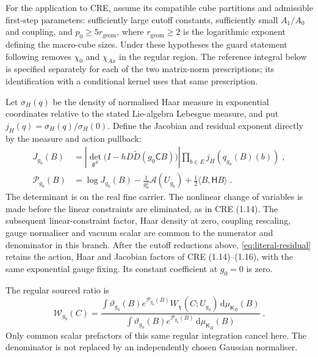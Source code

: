 \documentclass[11pt]{article}
\newcommand{\dd}{\mathrm{d}}
\begin{document}
For the application to CRE, assume its compatible cube partitions and admissible first-step parameters: sufficiently large cutoff constants, sufficiently small $A_1/A_0$ and coupling, and $p_0\geq5r_{\mathrm{geom}}$, where $r_{\mathrm{geom}}\geq2$ is the logarithmic exponent defining the macro-cube sizes. Under these hypotheses the guard statement following \cite[(1.10)]{BalabanCRE} removes $\chi_0$ and $\chi_{Ax}$ in the regular region. The reference integral below is specified separately for each of the two matrix-norm prescriptions; its identification with a conditional kernel uses that same prescription.

Let $\sigma_H(q)$ be the density of normalised Haar measure in exponential coordinates relative to the stated Lie-algebra Lebesgue measure, and put $j_H(q)=\sigma_H(q)/\sigma_H(0)$. Define the Jacobian and residual exponent directly by the measure and action pullback:
\begin{equation}\label{eq:literal-residual}
    \begin{aligned}
        J_{g_0}(B)&=
            \left|\det_{\mathfrak g^E}
                \bigl(I-hD\widetilde D(g_0\mathsf C B)\bigr)\right|
            \prod_{b\in E}j_H(q_{g_0}(B)(b))\;,\\
        \mathcal P_{g_0}(B)&=\log J_{g_0}(B)
            -\frac{1}{g_0^2}\mathscr A(U_{g_0})
            +\frac{1}{2}\langle B,\mathsf H B\rangle\;.
    \end{aligned}
\end{equation}
The determinant is on the real fine carrier. The nonlinear change of variables is made before the linear constraints are eliminated, as in CRE (1.14). The subsequent linear-constraint factor, Haar density at zero, coupling rescaling, gauge normaliser and vacuum scalar are common to the numerator and denominator in this branch. After the cutoff reductions above, \eqref{eq:literal-residual} retains the action, Haar and Jacobian factors of CRE (1.14)--(1.16), with the same exponential gauge fixing. Its constant coefficient at $g_0=0$ is zero.

The regular sourced ratio is
\begin{equation}\label{eq:flat-ratio}
    \mathcal W_{g_0}(C)=
        \frac{\displaystyle\int
            \vartheta_{g_0}(B)e^{\mathcal P_{g_0}(B)}
            W_\chi(C;U_{g_0})\,\dd\mu_{\mathsf K_B}(B)}
        {\displaystyle\int
            \vartheta_{g_0}(B)e^{\mathcal P_{g_0}(B)}
            \,\dd\mu_{\mathsf K_B}(B)}\;.
\end{equation}
Only common scalar prefactors of this same regular integration cancel here. The denominator is not replaced by an independently chosen Gaussian normaliser.
\end{document}
